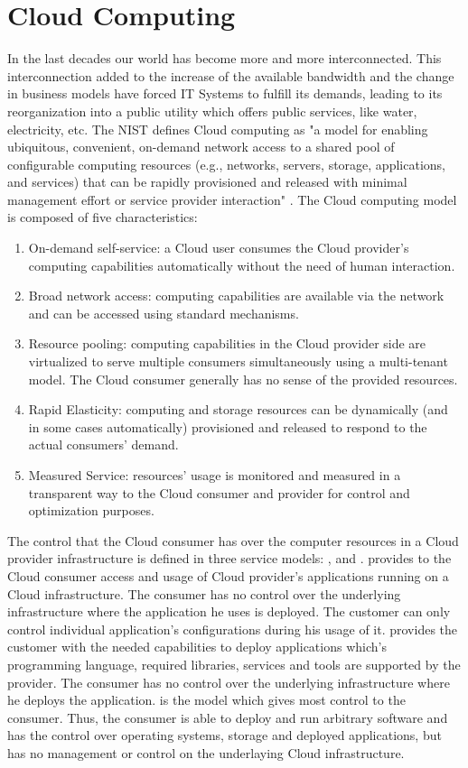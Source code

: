 \section{Cloud Computing}
\label{sec:cloudcomputing}

In the last decades our world has become more and more interconnected. This interconnection added to the increase of the available bandwidth and the change in business models have forced IT Systems to fulfill its demands, leading to its reorganization into a public utility which offers public services, like water, electricity, etc. The \ac{NIST} defines Cloud computing as "a model for enabling ubiquitous, convenient, on-demand network access to a shared pool of configurable computing resources (e.g., networks, servers, storage, applications, and services) that can be rapidly provisioned and released with minimal management effort or service provider interaction"  \cite{NIST2011}. The Cloud computing model is composed of five characteristics:
	\begin{enumerate}
		\item On-demand self-service: a Cloud user consumes the Cloud provider's computing capabilities automatically without the need of human interaction. 
		\item Broad network access: computing capabilities are available via the network and can be accessed using standard mechanisms.
		\item Resource pooling: computing capabilities in the Cloud provider side are virtualized to serve multiple consumers simultaneously using a multi-tenant model. The Cloud consumer generally has no sense of the provided resources.
		\item Rapid Elasticity: computing and storage resources can be dynamically (and in some cases automatically) provisioned and released to respond to the actual consumers' demand.
		\item Measured Service: resources' usage is monitored and measured in a transparent way to the Cloud consumer and provider for control and optimization purposes.
	\end{enumerate}

The control that the Cloud consumer has over the computer resources in a Cloud provider infrastructure is defined in three service models: ,  and .  provides to the Cloud consumer access and usage of Cloud provider's applications running on a Cloud infrastructure. The consumer has no control over the underlying infrastructure where the application he uses is deployed. The customer can only control individual application's configurations during his usage of it.  provides the customer with the needed capabilities to deploy applications which's programming language, required libraries, services and tools are supported by the provider. The consumer has no control over the underlying infrastructure where he deploys the application.  is the model which gives most control to the consumer. Thus, the consumer is able to deploy and run arbitrary software and has the control over operating systems, storage and deployed applications, but has no management or control on the underlaying Cloud infrastructure. 

